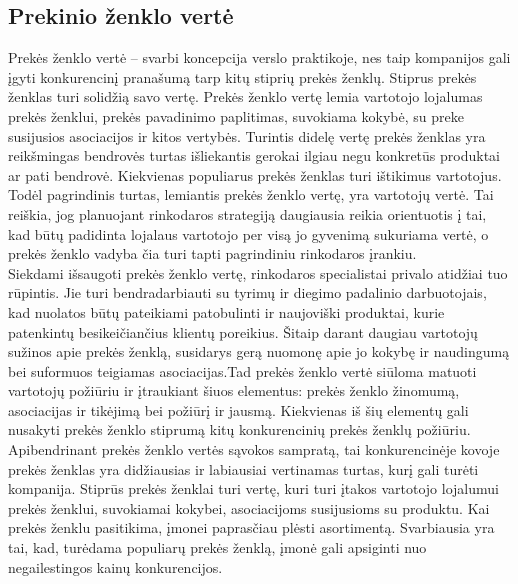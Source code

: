 \documentclass[12pt,titlepage]{article}
\begin{document}
\subsection{Prekinio ženklo vertė}
\justify
\hspace{\parindent}
Prekės ženklo vertė – svarbi koncepcija verslo praktikoje, nes taip kompanijos gali įgyti konkurencinį pranašumą tarp kitų stiprių prekės ženklų. Stiprus prekės ženklas turi solidžią savo vertę. Prekės ženklo vertę lemia vartotojo lojalumas prekės ženklui, prekės pavadinimo paplitimas, suvokiama kokybė, su preke susijusios asociacijos ir kitos vertybės. Turintis didelę vertę prekės ženklas yra reikšmingas bendrovės turtas išliekantis gerokai ilgiau negu konkretūs produktai ar pati bendrovė. Kiekvienas populiarus prekės ženklas turi ištikimus vartotojus. Todėl pagrindinis turtas, lemiantis prekės ženklo vertę, yra vartotojų vertė. Tai reiškia, jog planuojant rinkodaros strategiją daugiausia reikia orientuotis į tai, kad būtų padidinta lojalaus vartotojo per visą jo gyvenimą sukuriama vertė, o prekės ženklo vadyba čia turi tapti pagrindiniu rinkodaros įrankiu.\\

Siekdami išsaugoti prekės ženklo vertę, rinkodaros specialistai privalo atidžiai tuo rūpintis. Jie turi bendradarbiauti su tyrimų ir diegimo padalinio darbuotojais, kad nuolatos būtų pateikiami patobulinti ir naujoviški produktai, kurie patenkintų besikeičiančius klientų poreikius. Šitaip darant daugiau vartotojų sužinos apie prekės ženklą, susidarys gerą nuomonę apie jo kokybę ir naudingumą bei suformuos teigiamas asociacijas.Tad prekės ženklo vertė siūloma matuoti vartotojų požiūriu ir įtraukiant šiuos elementus: prekės ženklo žinomumą, asociacijas ir tikėjimą bei požiūrį ir jausmą. Kiekvienas iš šių elementų gali nusakyti prekės ženklo stiprumą kitų konkurencinių prekės ženklų požiūriu. \parencite{vanagiene2008prekes}\\

Apibendrinant prekės ženklo vertės sąvokos sampratą, tai konkurencinėje kovoje prekės ženklas yra didžiausias ir labiausiai vertinamas turtas, kurį gali turėti kompanija. Stiprūs prekės ženklai turi vertę, kuri turi įtakos vartotojo lojalumui prekės ženklui, suvokiamai kokybei, asociacijoms susijusioms su produktu. Kai prekės ženklu pasitikima, įmonei paprasčiau plėsti asortimentą. Svarbiausia yra tai, kad, turėdama populiarų prekės ženklą, įmonė gali apsiginti nuo negailestingos kainų konkurencijos. \parencite{vanagiene2008prekes}
\end{document}
